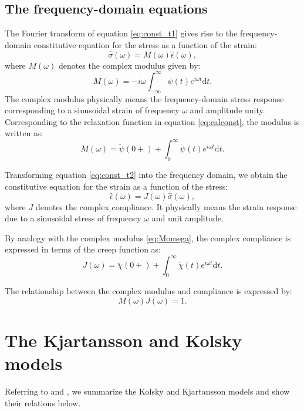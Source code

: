 \documentclass[article]{./macros/elsarticle_qh}
\begin{document}
\subsection{The frequency-domain equations}
The Fourier transform of equation \ref{eq:const_t1} gives rise to the frequency-domain constitutive equation for the stress as a function of the strain:
\begin{equation} \label{eq:const_f1}
\hat{\sigma}(\omega) = M(\omega) \hat{\epsilon}(\omega) ,
\end{equation}
where $M(\omega)$ denotes the complex modulus given by:
\begin{equation} \label{eq:Momega_gen}
M(\omega) =  -i \omega \int_{-\infty}^{\infty} \psi(t) e^{i\omega t} \text{d}t .
\end{equation}
The complex modulus physically means the frequency-domain stress response corresponding to a sinusoidal strain of frequency $\omega$ and amplitude unity. 
Corresponding to the relaxation function in equation \ref{eq:calconst}, the modulus is written as:
\begin{equation}  \label{eq:Momega}
M(\omega) =  \breve{\psi}(0+) 
+ \int_{0}^{\infty} \dot{\psi}(t) e^{i\omega t} \text{d}t .
\end{equation}

Transforming equation \ref{eq:const_t2} into the frequency domain, we obtain the constitutive equation for the strain as a function of the stress:
\begin{equation} \label{eq:const_f2}
\hat{\epsilon}(\omega) = J(\omega) \hat{\sigma}(\omega) ,
\end{equation} 
where $J$ denotes the complex compliance. It physically means the strain response due to a sinusoidal stress of frequency $\omega$ and unit amplitude. 

By analogy with the complex modulus \ref{eq:Momega}, the complex compliance is expressed in terms of the creep function as:
\begin{equation}  \label{eq:Comega}
J(\omega) =  \breve{\chi}(0+) 
+ \int_{0}^{\infty} \dot{\chi}(t) e^{i\omega t} \text{d}t .
\end{equation}

The relationship between the complex modulus and compliance is expressed by:
\begin{equation} \label{eq:MC}
M(\omega) J(\omega) = 1 .
\end{equation}

\section{The Kjartansson and Kolsky models}
Referring to \cite{kolsky:1956} and \cite{kjartansson:1979}, we summarize the Kolsky and Kjartansson models and show their relations below. 
\end{document}
